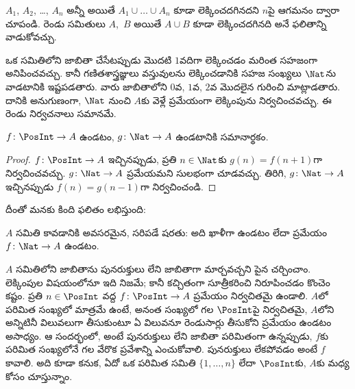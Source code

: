 \documentclass[../../../include/open-logic-section]{subfiles}
\begin{document}
\begin{prob}
  $A_1$, $A_2$, \dots, $A_n$ అన్నీ  అయితే
  $A_1 \cup \dots \cup A_n$ కూడా లెక్కించదగినదని $n$పై ఆగమనం
  ద్వారా చూపండి. రెండు సమితులు $A$,~$B$  అయితే
  $A \cup B$ కూడా లెక్కించదగినది అనే ఫలితాన్ని వాడుకోవచ్చు.
\end{prob}

ఒక సమితిలోని  జాబితా చేసేటప్పుడు మొదటి 
$1$వదిగా లెక్కించడం మరింత సహజంగా అనిపించవచ్చు. కానీ గణితశాస్త్రజ్ఞులు
వస్తువులను లెక్కించడానికి సహజ సంఖ్యలు $\Nat$ను వాడటానికి ఇష్టపడతారు.
వారు జాబితాలోని $0$వ, $1$వ, $2$వ మొదలైన  గురించి
మాట్లాడతారు. దానికి అనుగుణంగా, $\Nat$ నుంచి $A$కు వెళ్లే
 ప్రమేయంగా లెక్కింపును నిర్వచించవచ్చు. ఈ రెండు
నిర్వచనాలు సమానమే.

\begin{prop}
   $f\colon \PosInt \to A$ ఉండటం,
   $g\colon \Nat \to A$ ఉండటానికి సమానార్థకం.
\end{prop}

\begin{proof}
   $f\colon \PosInt \to A$ ఇచ్చినప్పుడు, ప్రతి
  $n \in \Nat$కు $g(n) = f(n+1)$గా నిర్వచించవచ్చు. $g\colon \Nat
  \to A$  ప్రమేయమని సులభంగా చూడవచ్చు. తిరిగి,
   $g\colon \Nat \to A$ ఇచ్చినప్పుడు
  $f(n) = g(n-1)$గా నిర్వచించండి.
\end{proof}

దీంతో మనకు కింది ఫలితం లభిస్తుంది:

\begin{cor}
$A$ సమితి  కావడానికి అవసరమైన, సరిపడే షరతు:
అది ఖాళీగా ఉండటం లేదా  ప్రమేయం
$f\colon \Nat \to A$ ఉండటం.
\end{cor}

$A$ సమితిలోని  జాబితాను పునరుక్తులు లేని జాబితాగా
మార్చవచ్చని పైన చర్చించాం. లెక్కింపుల విషయంలోనూ ఇది నిజమే; కానీ
కచ్చితంగా సూత్రీకరించి నిరూపించడం కొంచెం కష్టం. ప్రతి $n \in
\PosInt$ వద్ద $f\colon \PosInt \to A$ ప్రమేయం నిర్వచితమై ఉండాలి.
$A$లో పరిమిత సంఖ్యలో మాత్రమే  ఉంటే, అనంత సంఖ్యలో
 గల $\PosInt$పై నిర్వచితమై, $A$లోని 
అన్నిటినీ విలువలుగా తీసుకుంటూ ఏ విలువనూ రెండుసార్లు తీసుకోని ప్రమేయం
ఉండటం అసాధ్యం. ఆ సందర్భంలో, అంటే పునరుక్తులు లేని జాబితా పరిమితంగా
ఉన్నప్పుడు, $f$కు పరిమిత సంఖ్యలోనే  గల వేరొక ప్రవేశాన్ని
ఎంచుకోవాలి. పునరుక్తులు లేకపోవడం అంటే $f$  కావాలి.
అది  కూడా కనుక, ఏదో ఒక పరిమిత సమితి
$\{1, \dots, n\}$ లేదా $\PosInt$కు, $A$కు మధ్య  కోసం
చూస్తున్నాం.
\end{document}
